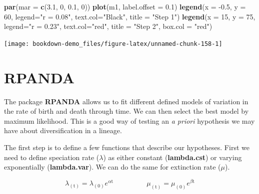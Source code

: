 \documentclass[
]{book}
\newenvironment{Shaded}{\begin{snugshade}}{\end{snugshade}}
\newcommand{\DataTypeTok}[1]{\textcolor[rgb]{0.13,0.29,0.53}{#1}}
\newcommand{\DecValTok}[1]{\textcolor[rgb]{0.00,0.00,0.81}{#1}}
\newcommand{\FloatTok}[1]{\textcolor[rgb]{0.00,0.00,0.81}{#1}}
\newcommand{\KeywordTok}[1]{\textcolor[rgb]{0.13,0.29,0.53}{\textbf{#1}}}
\newcommand{\NormalTok}[1]{#1}
\newcommand{\StringTok}[1]{\textcolor[rgb]{0.31,0.60,0.02}{#1}}
\begin{document}
\begin{Shaded}
\begin{Highlighting}[]
\KeywordTok{par}\NormalTok{(}\DataTypeTok{mar =} \KeywordTok{c}\NormalTok{(}\FloatTok{3.1}\NormalTok{, }\DecValTok{0}\NormalTok{, }\FloatTok{0.1}\NormalTok{, }\DecValTok{0}\NormalTok{))}
\KeywordTok{plot}\NormalTok{(m1, }\DataTypeTok{label.offset =} \FloatTok{0.1}\NormalTok{)}
\KeywordTok{legend}\NormalTok{(}\DataTypeTok{x =} \FloatTok{{-}0.5}\NormalTok{, }\DataTypeTok{y =} \DecValTok{60}\NormalTok{, }\DataTypeTok{legend=}\StringTok{"r = 0.08"}\NormalTok{,}
       \DataTypeTok{text.col=}\StringTok{"Black"}\NormalTok{, }\DataTypeTok{title =} \StringTok{"Step 1"}\NormalTok{)}
\KeywordTok{legend}\NormalTok{(}\DataTypeTok{x =} \DecValTok{15}\NormalTok{, }\DataTypeTok{y =} \DecValTok{75}\NormalTok{, }\DataTypeTok{legend=}\StringTok{"r = 0.23"}\NormalTok{,}
       \DataTypeTok{text.col=}\StringTok{"red"}\NormalTok{, }\DataTypeTok{title =} \StringTok{"Step 2"}\NormalTok{, }\DataTypeTok{box.col =} \StringTok{"red"}\NormalTok{)}
\end{Highlighting}
\end{Shaded}

\begin{center}\texttt{[image: bookdown-demo\_files/figure-latex/unnamed-chunk-158-1]} \end{center}

\hypertarget{rpanda}{%
\section{RPANDA}\label{rpanda}}

The package \textbf{RPANDA} \citep{rpanda} allows us to fit different defined models of variation in the rate of birth and death through time. We can then select the best model by maximum likelihood. This is a good way of testing an \emph{a priori} hypothesis we may have about diversification in a lineage.

The first step is to define a few functions that describe our hypotheses. First we need to define speciation rate (\(\lambda\)) as either constant (\textbf{lambda.cst}) or varying exponentially (\textbf{lambda.var}). We can do the same for extinction rate (\(\mu\)).

\[ \lambda_{(\text{t})} = \lambda_{(0)}e^{\alpha \text{t}} \;\;\;\;\;\;\;\;\;\;\;\;\;\;\;\;\;  \mu_{(\text{t})} = \mu_{(0)}e^{\beta \text{t}} \]
\end{document}
